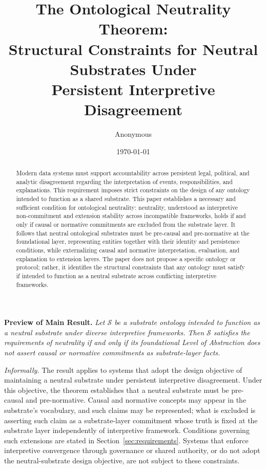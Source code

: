 \documentclass[11pt]{article}
\title{
The Ontological Neutrality Theorem:\\
Structural Constraints for Neutral Substrates Under \\
Persistent Interpretive Disagreement
}
\author{Anonymous}
\affil{Anonymous Institution}
\date{\today} %
\theoremstyle{plain}
\theoremstyle{definition}
\theoremstyle{remark}
\begin{document}
\maketitle
\vspace{-1em}
\begin{abstract}
Modern data systems must support accountability
across persistent legal, political, and analytic disagreement
regarding the interpretation of events, responsibilities, and explanations.
This requirement imposes strict constraints
on the design of any ontology intended to function as a shared substrate.
This paper establishes a necessary and sufficient condition for ontological neutrality:
neutrality, understood as interpretive non-commitment and
extension stability across incompatible frameworks,
holds if and only if causal or normative commitments are excluded from the substrate layer.
It follows that neutral ontological substrates
must be pre-causal and pre-normative at the foundational layer,
representing entities together with their identity and persistence conditions,
while externalizing causal and normative interpretation, evaluation, and explanation
to extension layers.
The paper does not propose a specific ontology or protocol;
rather, it identifies the structural constraints that any ontology
must satisfy if intended to function as a neutral substrate
across conflicting interpretive frameworks.
\end{abstract}


\bigskip
\noindent\textbf{Preview of Main Result.}
\emph{Let $\mathcal{S}$ be a substrate ontology intended to function
  as a neutral substrate under diverse interpretive frameworks.
  Then $\mathcal{S}$ satisfies the requirements of neutrality
  if and only if its foundational Level of Abstraction
  does not assert causal or normative commitments
  as substrate-layer facts.}

\medskip
\noindent
\emph{Informally.}
The result applies to systems that adopt the design objective
of maintaining a neutral substrate under persistent interpretive disagreement.
Under this objective, the theorem establishes that a neutral substrate must be
pre-causal and pre-normative.
Causal and normative concepts may appear in the substrate's
vocabulary, and such claims may be represented;
what is excluded is asserting such claim as a substrate-layer commitment
whose truth is fixed at the substrate layer independently of interpretive framework.
Conditions governing such extensions are stated
in Section~\ref{sec:requirements}.
Systems that enforce interpretive convergence through governance or shared authority,
or do not adopt the neutral-substrate design objective,
are not subject to these constraints.
\end{document}
